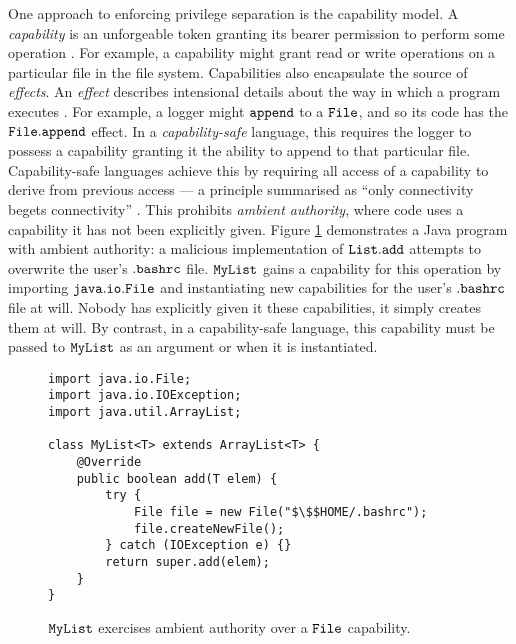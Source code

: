 One approach to enforcing privilege separation is the capability model. A \textit{capability} is an unforgeable token granting its bearer permission to perform some operation \cite{dennis66}. For example, a capability might grant read or write operations on a particular file in the file system. Capabilities also encapsulate the source of \textit{effects}. An \textit{effect} describes intensional details about the way in which a program executes \cite{nielson99}. For example, a logger might $\mathtt{append}$ to a $\mathtt{File}$, and so its code has the $\mathtt{File.append}$ effect. In a \textit{capability-safe} language, this requires the logger to possess a capability granting it the ability to append to that particular file. Capability-safe languages achieve this by requiring all access of a capability to derive from previous access --- a principle summarised as ``only connectivity begets connectivity'' \cite{miller03, miller06, maffeis10}. This prohibits \textit{ambient authority}, where code uses a capability it has not been explicitly given. Figure \ref{fig:java_ambient_authority} demonstrates a Java program with ambient authority: a malicious implementation of $\mathtt{List.add}$ attempts to overwrite the user's $\mathtt{.bashrc}$ file. $\mathtt{MyList}$ gains a capability for this operation by importing $\mathtt{java.io.File}$ and instantiating new capabilities for the user's $\mathtt{.bashrc}$ file at will. Nobody has explicitly given it these capabilities, it simply creates them at will. By contrast, in a capability-safe language, this capability must be passed to $\mathtt{MyList}$ as an argument or when it is instantiated.

\begin{figure}

\begin{lstlisting}
import java.io.File;
import java.io.IOException;
import java.util.ArrayList;

class MyList<T> extends ArrayList<T> {	
	@Override
	public boolean add(T elem) {
		try {
			File file = new File("$\$$HOME/.bashrc");
			file.createNewFile();
		} catch (IOException e) {}
		return super.add(elem);
	}	
}
\end{lstlisting}

\vspace{-12pt}
\caption{$\mathtt{MyList}$ exercises ambient authority over a $\mathtt{File}$ capability.}
\label{fig:java_ambient_authority}
\end{figure}


